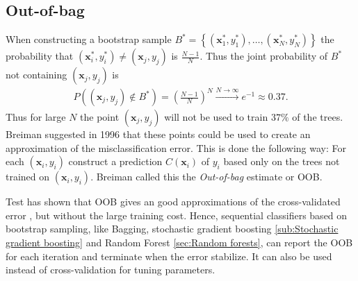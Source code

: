 \subsection{Out-of-bag}
\label{sub:Out-of-bag}
When constructing a bootstrap sample $B^* = \left\{ (\mathbf{x}_1^*, y_1^*), \ldots, (\mathbf{x}_N^*, y_N^*) \right\}$ the probability that $(\mathbf{x}_i^*, y_i^*) \neq (\mathbf{x}_j, y_j)$ is $\frac{N-1}{N}$. Thus the joint probability of $B^*$ not containing $(\mathbf{x}_j, y_j)$ is 
\begin{align}
  P\left(  (\mathbf{x}_j, y_j) \notin B^*\right) = \left( \frac{N-1}{N}  \right)^N
  \xrightarrow{N \rightarrow \infty} e^{-1} \approx 0.37. 
\end{align}
Thus for large $N$ the point $(\mathbf{x}_j, y_j)$ will not be used to train $37 \%$ of the trees. Breiman suggested in 1996 \cite{outOfBag} that these points could be used to create an approximation of the misclassification error. This is done the following way: For each $(\mathbf{x}_i, y_i)$ construct a prediction $C(\mathbf{x}_i)$ of $y_i$ based only on the trees not trained on $(\mathbf{x}_i, y_i)$. Breiman called this the \textit{Out-of-bag} estimate or OOB. 

Test has shown that OOB gives an good approximations of the cross-validated error \cite{outOfBag}, but without the large training cost. 
Hence, sequential classifiers based on bootstrap sampling, like Bagging, stochastic gradient boosting \ref{sub:Stochastic gradient boosting} and Random Forest \ref{sec:Random forests}, can report the OOB for each iteration and terminate when the error stabilize. It can also be used instead of cross-validation for tuning parameters.


